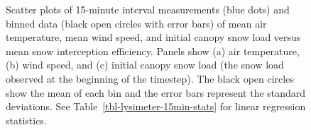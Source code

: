 \documentclass[
  letterpaper,
  DIV=11,
  numbers=noendperiod]{scrartcl}
\begin{document}
\begin{figure}[H]


\caption{\label{fig-scl-ip-avg-15min}Scatter plots of 15-minute interval
measurements (blue dots) and binned data (black open circles with error
bars) of mean air temperature, mean wind speed, and initial canopy snow
load versus mean snow interception efficiency. Panels show (a) air
temperature, (b) wind speed, and (c) initial canopy snow load (the snow
load observed at the beginning of the timestep). The black open circles
show the mean of each bin and the error bars represent the standard
deviations. See Table~\ref{tbl-lysimeter-15min-stats} for linear
regression statistics.}

\end{figure}%
\end{document}
